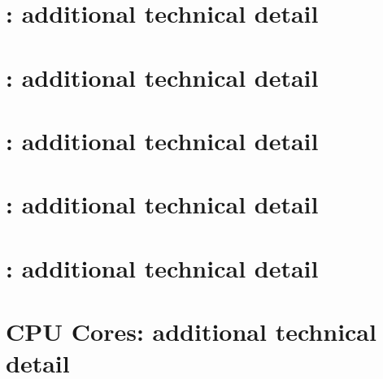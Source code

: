 \documentclass[preprint]{iacrtrans}
\begin{document}

\appendix

\clearpage
\section{:       additional technical detail}
\label{sec:pseudo:v1}

\clearpage
\section{:       additional technical detail}
\label{sec:pseudo:v2}

\clearpage
\section{:       additional technical detail}
\label{sec:pseudo:v3}

\clearpage
\section{:       additional technical detail}
\label{sec:pseudo:v4}

\clearpage
\section{:       additional technical detail}
\label{sec:pseudo:v5}

\clearpage
\section{CPU Cores: additional technical detail}
\label{sec:cores}


%

\end{document}
